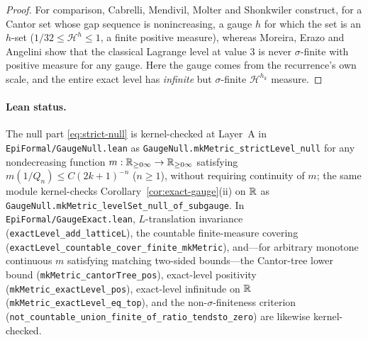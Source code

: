 \begin{proof}
For comparison, Cabrelli, Mendivil, Molter and Shonkwiler
\cite[\S5, Theorem~3]{CMMS} construct, for a Cantor set whose gap
sequence is nonincreasing, a gauge $h$ for which the set is an $h$-set
($1/32\le\mathcal H^h\le1$, a finite positive measure), whereas Moreira, Erazo
and Angelini \cite{MEA} show that the classical Lagrange level at value $3$ is
never $\sigma$-finite with positive measure for any gauge. Here the gauge comes
from the recurrence's own scale, and the entire exact level has \emph{infinite}
but $\sigma$-finite $\mathcal H^{h_k}$ measure.
\end{proof}

\paragraph{Lean status.}
The null part \eqref{eq:strict-null} is kernel-checked at Layer~A in
\texttt{EpiFormal/\allowbreak GaugeNull.lean} as
\texttt{GaugeNull.\allowbreak mkMetric\_\allowbreak strictLevel\_\allowbreak null}
for any nondecreasing function $m:\mathbb{R}_{\ge0\infty}\to\mathbb{R}_{\ge0\infty}$ satisfying
$m(1/Q_n)\le C(2k+1)^{-n}$ ($n\ge1$), without requiring continuity of $m$; the
same module kernel-checks Corollary~\ref{cor:exact-gauge}(ii) on $\mathbb{R}$ as
\texttt{GaugeNull.\allowbreak mkMetric\_\allowbreak levelSet\_\allowbreak null\_\allowbreak of\_\allowbreak subgauge}.
In \texttt{EpiFormal/\allowbreak GaugeExact.lean}, $L$-translation invariance
(\texttt{exactLevel\_\allowbreak add\_\allowbreak latticeL}), the countable
finite-measure covering
(\texttt{exactLevel\_\allowbreak countable\_\allowbreak cover\_\allowbreak finite\_\allowbreak mkMetric}),
and---for arbitrary monotone continuous $m$ satisfying matching two-sided
bounds---the Cantor-tree lower bound
(\texttt{mkMetric\_\allowbreak cantorTree\_\allowbreak pos}), exact-level
positivity (\texttt{mkMetric\_\allowbreak exactLevel\_\allowbreak pos}),
exact-level infinitude on $\mathbb{R}$
(\texttt{mkMetric\_\allowbreak exactLevel\_\allowbreak eq\_\allowbreak top}),
and the non-$\sigma$-finiteness criterion
(\texttt{not\_\allowbreak countable\_\allowbreak union\_\allowbreak finite\_\allowbreak of\_\allowbreak ratio\_\allowbreak tendsto\_\allowbreak zero})
are likewise kernel-checked.

